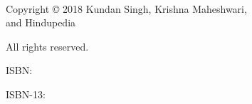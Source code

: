 \thispagestyle{empty}
~
\vfill
\begin{center}
Copyright © 2018 Kundan Singh, Krishna Maheshwari,\\ and Hindupedia
\bigskip


All rights reserved.
\medskip

ISBN:
\smallskip

ISBN-13:
\end{center}
\vfill
\vfill
